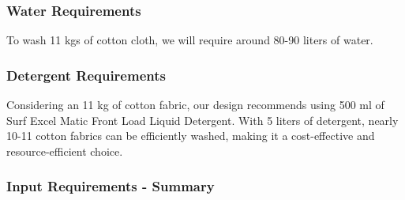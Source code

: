 \documentclass[12pt]{article} %
\begin{document}
   \subsubsection{Water Requirements} To wash 11 kgs of cotton cloth, we will require around 80-90 liters of water.
   \subsubsection{Detergent Requirements} Considering an 11 kg of cotton fabric, our design recommends using 500 ml of Surf Excel Matic Front Load Liquid Detergent. With 5 liters of detergent, nearly 10-11 cotton fabrics can be efficiently washed, making it a cost-effective and resource-efficient choice.

\subsubsection{Input Requirements - Summary}
\end{document}
